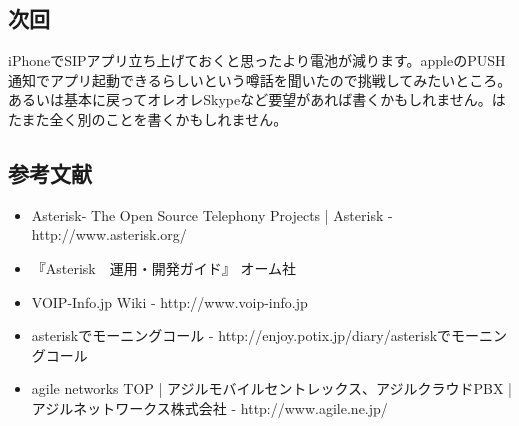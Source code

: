 \subsection{次回}
iPhoneでSIPアプリ立ち上げておくと思ったより電池が減ります。appleのPUSH通知でアプリ起動できるらしいという噂話を聞いたので挑戦してみたいところ。あるいは基本に戻ってオレオレSkypeなど要望があれば書くかもしれません。はたまた全く別のことを書くかもしれません。

\subsection{参考文献}
\begin{itemize}
\item Asterisk- The Open Source Telephony Projects | Asterisk - http://www.asterisk.org/
\item 『Asterisk　運用・開発ガイド』 オーム社
\item VOIP-Info.jp Wiki - http://www.voip-info.jp
\item asteriskでモーニングコール - http://enjoy.potix.jp/diary/asteriskでモーニングコール
\item agile networks TOP | アジルモバイルセントレックス、アジルクラウドPBX | アジルネットワークス株式会社 - http://www.agile.ne.jp/
\end{itemize}
